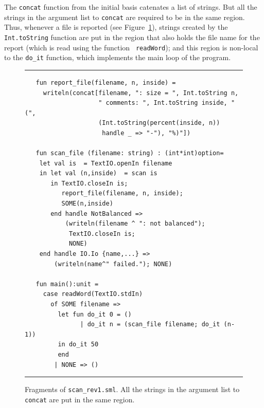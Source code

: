 \documentclass[12pt]{book}
\begin{document}
The {\tt concat} function from the initial basis catenates a list of
strings. But all the strings in the argument list to {\tt concat} are
required to be in the same region. Thus, whenever a file is reported
(see Figure~\ref{report_file.fig}), strings created by the {\tt
  Int.toString} function are put in the region that also holds the
file name for the report (which is read using the function {\tt
  readWord}); and this region is non-local to the {\tt do\_it}
function, which implements the main loop of the program.
\begin{figure}
\hrule \medskip
\begin{verbatim}
   fun report_file(filename, n, inside) = 
     writeln(concat[filename, ": size = ", Int.toString n, 
                    " comments: ", Int.toString inside, " (",
                    (Int.toString(percent(inside, n)) 
                     handle _ => "-"), "%)"])

   fun scan_file (filename: string) : (int*int)option=
    let val is  = TextIO.openIn filename 
    in let val (n,inside)  = scan is
       in TextIO.closeIn is; 
          report_file(filename, n, inside);
          SOME(n,inside)
       end handle NotBalanced => 
           (writeln(filename ^ ": not balanced");
            TextIO.closeIn is;
            NONE)
    end handle IO.Io {name,...} => 
        (writeln(name^" failed."); NONE)

   fun main():unit =
     case readWord(TextIO.stdIn)
       of SOME filename =>
         let fun do_it 0 = ()
               | do_it n = (scan_file filename; do_it (n-1))
         in do_it 50
         end
        | NONE => ()
\end{verbatim}
\caption{Fragments of {\tt scan\_rev1.sml}. All the strings in the 
  argument list to {\tt concat} are put in the same region.}
\label{report_file.fig}
\medskip \hrule
\end{figure}
\end{document}
